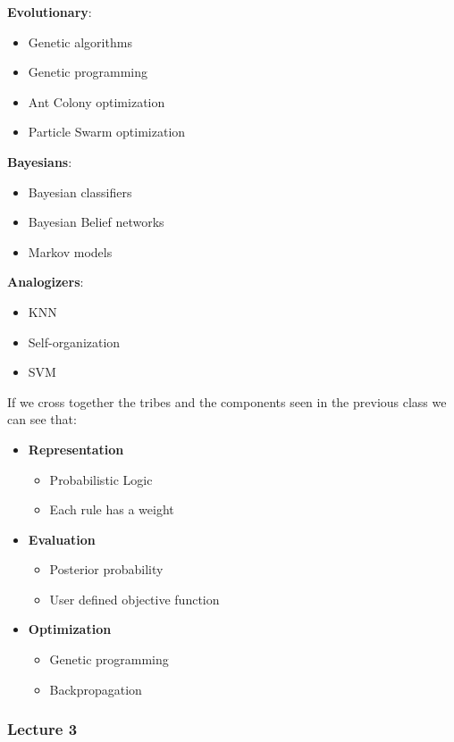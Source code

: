 \textbf{Evolutionary}:
\begin{itemize}
    \item Genetic algorithms
    \item Genetic programming
    \item Ant Colony optimization
    \item Particle Swarm optimization
\end{itemize}

\textbf{Bayesians}:
\begin{itemize}
    \item Bayesian classifiers
    \item Bayesian Belief networks
    \item Markov models
\end{itemize}

\textbf{Analogizers}:
\begin{itemize}
    \item KNN
    \item Self-organization
    \item SVM
\end{itemize}

If we cross together the tribes and the components seen in the previous class we can see that:

\begin{itemize}
    \item \textbf{Representation}
    \begin{itemize}
        \item Probabilistic Logic
        \item Each rule has a weight
    \end{itemize}
    \item \textbf{Evaluation}
    \begin{itemize}
        \item Posterior probability
        \item User defined objective function
    \end{itemize}
    \item \textbf{Optimization}
    \begin{itemize}
        \item Genetic programming
        \item Backpropagation
    \end{itemize}
\end{itemize}


\subsubsection{Lecture 3}

